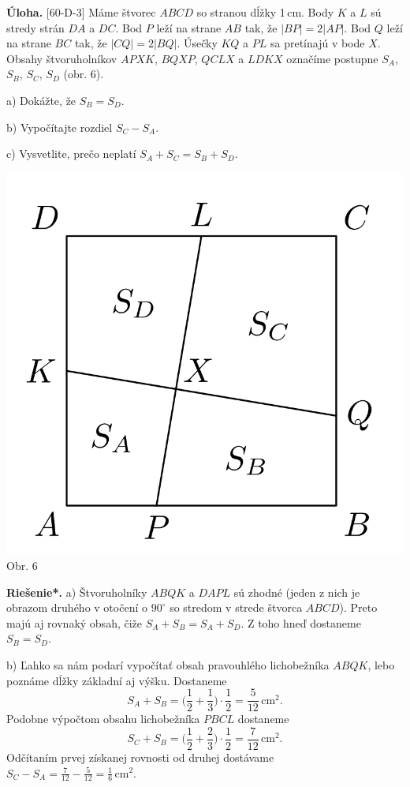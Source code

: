 \documentclass[11pt,a4paper,oneside,final]{book}
\newcommand{\ul}{\textbf{Úloha.} }
\newcommand{\rieh}{\textbf{Riešenie*.} }
\begin{document}
\begin{tcolorbox}[breakable,notitle,boxrule=0pt,colback=light-gray,colframe=light-gray]\ul [60-D-3]  Máme štvorec $ABCD$ so stranou dĺžky 1\,cm. Body $K$ a $L$ sú stredy strán $DA$ a $DC$. Bod $P$ leží na strane $AB$ tak, že $| BP | = 2 | AP |$. Bod $Q$ leží na strane $BC$ tak, že $| CQ | = 2 | BQ |$. Úsečky $KQ$ a $PL$ sa pretínajú v bode $X$. Obsahy štvoruholníkov $APXK$, $BQXP$, $QCLX$ a $LDKX$ označíme postupne $S_A$, $S_B$, $S_C$, $S_D$ (obr. 6).

a) Dokážte, že $S_B = S_D$.

b) Vypočítajte rozdiel $S_C - S_A$.

c) Vysvetlite, prečo neplatí $S_A + S_C = S_B + S_D$.
\begin{center}
\includegraphics[scale=0.3]{60D31}\\

Obr. 6
\end{center}
\end{tcolorbox}

\rieh  a) Štvoruholníky $ABQK$ a $DAPL$ sú zhodné (jeden z nich je obrazom druhého v otočení o $90^\circ$ so stredom v strede štvorca $ABCD$). Preto majú aj rovnaký obsah, čiže $S_A + S_B = S_A + S_D$. Z toho hneď dostaneme $S_B = S_D$.

b) Ľahko sa nám podarí vypočítať obsah pravouhlého lichobežníka $ABQK$, lebo poznáme dĺžky základní aj výšku. Dostaneme
$$S_A + S_B =\bigg( \frac{1}{2}+\frac{1}{3}\bigg)\cdot \frac{1}{2}=\frac{5}{12}\,\text{cm}^2.$$
Podobne výpočtom obsahu lichobežníka $PBCL$ dostaneme
$$S_C + S_B =\bigg(\frac{1}{2}+\frac{2}{3}\bigg)\cdot\frac{1}{2}=\frac{7}{12}\,\text{cm}^2.$$
Odčítaním prvej získanej rovnosti od druhej dostávame $S_C - S_A =\frac{7}{12}-\frac{5}{12}=\frac{1}{6}\,\text{cm}^2$.
\end{document}
